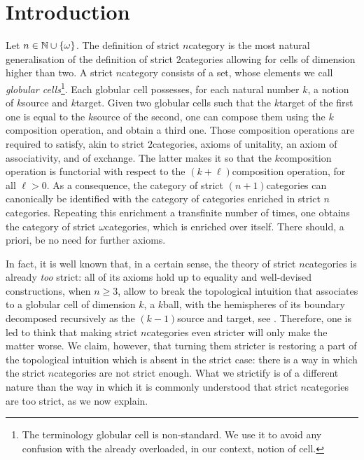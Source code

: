\section{Introduction}

Let \( n \in \mathbb{N} \cup \left\{ {\omega} \right\} \).
The definition of strict \( n \)\nbd category is the most natural generalisation of the definition of strict \( 2 \)\nbd categories allowing for cells of dimension higher than two.
A strict \( n \)\nbd category \cite{brown1981groupoids} consists of a set, whose elements we call \emph{globular cells}\footnote{The terminology globular cell is non-standard. We use it to avoid any confusion with the already overloaded, in our context, notion of cell.}.
Each globular cell possesses, for each natural number \( k \), a notion of \( k \)\nbd source and \( k \)\nbd target. 
Given two globular cells such that the \( k \)\nbd target of the first one is equal to the \( k \)\nbd source of the second, one can compose them using the \( k \)\nbd composition operation, and obtain a third one.
Those composition operations are required to satisfy, akin to strict \( 2 \)\nbd categories, axioms of unitality, an axiom of associativity, and of exchange.
The latter makes it so that the \( k \)\nbd composition operation is functorial with respect to the \( (k + \ell) \)\nbd composition operation, for all \( \ell > 0 \).
As a consequence, the category of strict \( (n + 1) \)\nbd categories can canonically be identified with the category of categories enriched in strict \( n \)\nbd categories. 
Repeating this enrichment a transfinite number of times, one obtains the category of strict \( \omega \)\nbd categories, which is enriched over itself.
There should, a priori, be no need for further axioms.   

In fact, it is well known that, in a certain sense, the theory of strict \( n \)\nbd categories is already \emph{too} strict: all of its axioms hold up to equality and well-devised constructions, when \( n \geq 3 \), allow to break the topological intuition that associates to a globular cell of dimension \( k \), a \( k \)\nbd ball, with the hemispheres of its boundary decomposed recursively as the \( (k - 1) \)\nbd source and target, see \cite{simpson1998homotopy}.
Therefore, one is led to think that making strict \( n \)\nbd categories even stricter will only make the matter worse.
We claim, however, that turning them stricter is restoring a part of the topological intuition which is absent in the strict case: there is a way in which the strict \( n \)\nbd categories are not strict enough.
What we strictify is of a different nature than the way in which it is commonly understood that strict \( n \)\nbd categories are too strict, as we now explain.

